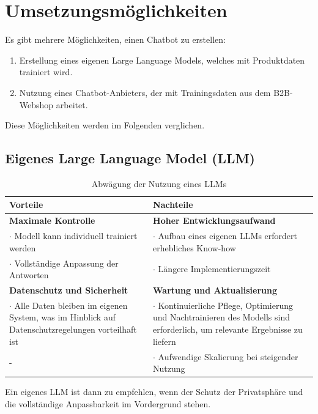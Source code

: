 \documentclass[%
	12pt,
	a4paper,
	oneside,
	parskip=full
]{scrbook}
\begin{document}
\section{Umsetzungsmöglichkeiten}
Es gibt mehrere Möglichkeiten, einen Chatbot zu erstellen:
\begin{enumerate}
	\item Erstellung eines eigenen Large Language Models, welches mit Produktdaten trainiert wird.
	\item Nutzung eines Chatbot-Anbieters, der mit Trainingsdaten aus dem B2B-Webshop arbeitet.
\end{enumerate}
Diese Möglichkeiten werden im Folgenden verglichen.
\subsection{Eigenes Large Language Model (LLM)}
\begin{table}[ht]
	\centering
	\begin{tabularx}{\textwidth}{X|X}
		Vorteile & Nachteile \\ \hline \hline
		\textbf{Maximale Kontrolle} & \textbf{Hoher Entwicklungsaufwand} \\
		$\cdot$ Modell kann individuell trainiert werden & $\cdot$ Aufbau eines eigenen LLMs erfordert erhebliches Know-how\\
		$\cdot$ Vollständige Anpassung der Antworten & $\cdot$ Längere Implementierungszeit\\ \hline
		\textbf{Datenschutz und Sicherheit} & \textbf{Wartung und Aktualisierung} \\
		$\cdot$ Alle Daten bleiben im eigenen System, was im Hinblick auf Datenschutzregelungen vorteilhaft ist & $\cdot$ Kontinuierliche Pflege, Optimierung und Nachtrainieren des Modells sind erforderlich, um relevante Ergebnisse zu liefern \\
		- & $\cdot$ Aufwendige Skalierung bei steigender Nutzung \\
	\end{tabularx}
	\caption{Abwägung der Nutzung eines LLMs}
\end{table}
Ein eigenes LLM ist dann zu empfehlen, wenn der Schutz der Privatsphäre und die vollständige Anpassbarkeit im Vordergrund stehen.
\end{document}
